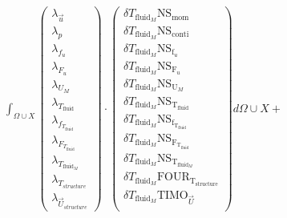 \documentclass[10pt]{article} %
\begin{document}
\begin{center}
		$\int_{\Omega \cup X}
	\begin{pmatrix}
		\lambda_{\vec{u}} \\ \lambda_p \\ \lambda_{f_u} \\ \lambda_{F_u} \\ \lambda_{U_M}\\ \lambda_{T_{\text{fluid}}} \\ \lambda_{f_{T_{\text{fluid}}}} \\ \lambda_{F_{T_{\text{fluid}}}} \\ \lambda_{T_{\text{fluid}_M}} \\ \lambda_{T_{structure}} \\ \lambda_{\vec{U}_{structure}}
	\end{pmatrix}
	\cdot
	\begin{pmatrix}
		\delta T_{\text{fluid}_M} \text{NS}_{\text{mom}} \\
		\delta T_{\text{fluid}_M} \text{NS}_{\text{conti}}\\
		\delta T_{\text{fluid}_M} \text{NS}_{\text{f}_u} \\
		\delta T_{\text{fluid}_M} \text{NS}_{\text{F}_u} \\
		\delta T_{\text{fluid}_M} \text{NS}_{\text{U}_M} \\
		\delta T_{\text{fluid}_M} \text{NS}_{\text{T}_{\text{fluid}}} \\
		\delta T_{\text{fluid}_M} \text{NS}_{\text{f}_{\text{T}_{\text{fluid}}}}\\
		\delta T_{\text{fluid}_M} \text{NS}_{\text{F}_{\text{T}_{\text{fluid}}}}\\
		\delta T_{\text{fluid}_M} \text{NS}_{\text{T}_{\text{fluid}_M}}\\
		\delta T_{\text{fluid}_M} \text{FOUR}_{\text{T}_{\text{structure}}}\\
		\delta T_{\text{fluid}_M} \text{TIMO}_{\vec{U}}\\
	\end{pmatrix}
	d\Omega \cup X +$\\
	

\end{center}
\end{document}
